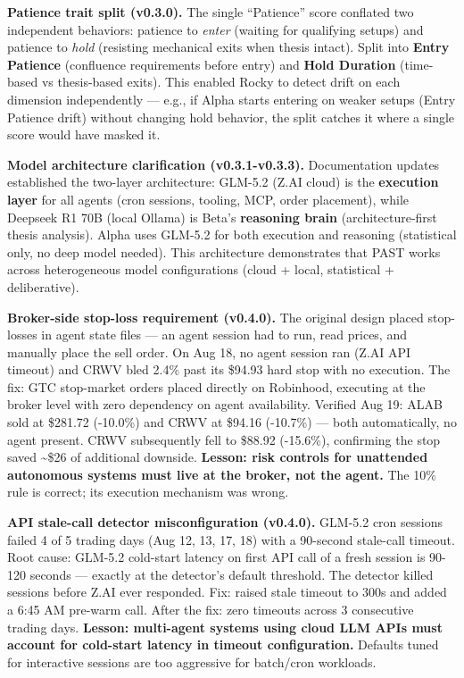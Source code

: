 \documentclass[11pt]{article}
\begin{document}
\textbf{Patience trait split (v0.3.0).} The single ``Patience'' score conflated two independent behaviors: patience to \emph{enter} (waiting for qualifying setups) and patience to \emph{hold} (resisting mechanical exits when thesis intact). Split into \textbf{Entry Patience} (confluence requirements before entry) and \textbf{Hold Duration} (time-based vs thesis-based exits). This enabled Rocky to detect drift on each dimension independently --- e.g., if Alpha starts entering on weaker setups (Entry Patience drift) without changing hold behavior, the split catches it where a single score would have masked it.

\textbf{Model architecture clarification (v0.3.1-v0.3.3).} Documentation updates established the two-layer architecture: GLM-5.2 (Z.AI cloud) is the \textbf{execution layer} for all agents (cron sessions, tooling, MCP, order placement), while Deepseek R1 70B (local Ollama) is Beta's \textbf{reasoning brain} (architecture-first thesis analysis). Alpha uses GLM-5.2 for both execution and reasoning (statistical only, no deep model needed). This architecture demonstrates that PAST works across heterogeneous model configurations (cloud + local, statistical + deliberative).

\textbf{Broker-side stop-loss requirement (v0.4.0).} The original design placed stop-losses in agent state files --- an agent session had to run, read prices, and manually place the sell order. On Aug 18, no agent session ran (Z.AI API timeout) and CRWV bled 2.4\% past its \$94.93 hard stop with no execution. The fix: GTC stop-market orders placed directly on Robinhood, executing at the broker level with zero dependency on agent availability. Verified Aug 19: ALAB sold at \$281.72 (-10.0\%) and CRWV at \$94.16 (-10.7\%) --- both automatically, no agent present. CRWV subsequently fell to \$88.92 (-15.6\%), confirming the stop saved \textasciitilde\$26 of additional downside. \textbf{Lesson: risk controls for unattended autonomous systems must live at the broker, not the agent.} The 10\% rule is correct; its execution mechanism was wrong.

\textbf{API stale-call detector misconfiguration (v0.4.0).} GLM-5.2 cron sessions failed 4 of 5 trading days (Aug 12, 13, 17, 18) with a 90-second stale-call timeout. Root cause: GLM-5.2 cold-start latency on first API call of a fresh session is 90-120 seconds --- exactly at the detector's default threshold. The detector killed sessions before Z.AI ever responded. Fix: raised stale timeout to 300s and added a 6:45 AM pre-warm call. After the fix: zero timeouts across 3 consecutive trading days. \textbf{Lesson: multi-agent systems using cloud LLM APIs must account for cold-start latency in timeout configuration.} Defaults tuned for interactive sessions are too aggressive for batch/cron workloads.
\end{document}

